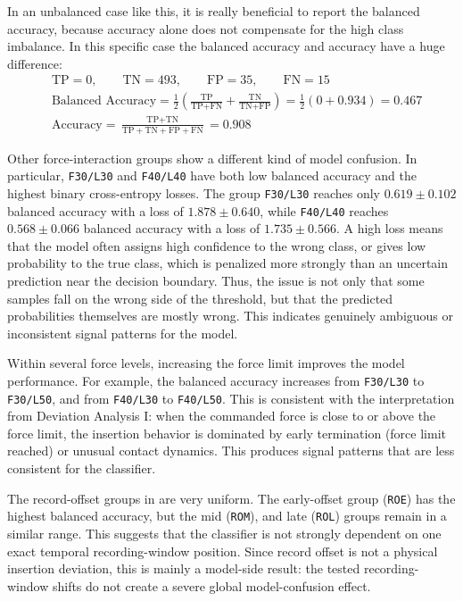 In an unbalanced case like this, it is really beneficial to report the balanced accuracy, because accuracy alone does not compensate for the high class imbalance.
In this specific case the balanced accuracy and accuracy have a huge difference:
\begin{align*}
    &\text{TP} = 0, \qquad \text{TN} = 493, \qquad \text{FP} = 35, \qquad \text{FN} = 15\\
    &\text{Balanced Accuracy} = \frac{1}{2}\left( \frac{\text{TP}}{\text{TP} + \text{FN}} + \frac{\text{TN}}{\text{TN} + \text{FP}} \right)= \frac{1}{2}(0 + 0.934) = 0.467\\
    &\text{Accuracy} = \frac{\text{TP} + \text{TN}}{\text{TP} + \text{TN} + \text{FP} + \text{FN}} = 0.908
    \label{eq:bal_acc_vs_acc}
\end{align*}

Other force-interaction groups show a different kind of model confusion. In particular, \texttt{F30/L30} and \texttt{F40/L40} have both low balanced accuracy and the highest binary cross-entropy losses. The group \texttt{F30/L30} reaches only $0.619 \pm 0.102$ balanced accuracy with a loss of $1.878 \pm 0.640$, while \texttt{F40/L40} reaches $0.568 \pm 0.066$ balanced accuracy with a loss of $1.735 \pm 0.566$. A high loss means that the model often assigns high confidence to the wrong class, or gives low probability to the true class, which is penalized more strongly than an uncertain prediction near the decision boundary. Thus, the issue is not only that some samples fall on the wrong side of the threshold, but that the predicted probabilities themselves are mostly wrong. This indicates genuinely ambiguous or inconsistent signal patterns for the model.

Within several force levels, increasing the force limit improves the model performance. For example, the balanced accuracy increases from \texttt{F30/L30} to \texttt{F30/L50}, and from \texttt{F40/L30} to \texttt{F40/L50}. This is consistent with the interpretation from Deviation Analysis I: when the commanded force is close to or above the force limit, the insertion behavior is dominated by early termination (force limit reached) or unusual contact dynamics. This produces signal patterns that are less consistent for the classifier.

The record-offset groups in  are very uniform. The early-offset group (\texttt{ROE}) has the highest balanced accuracy, but the mid (\texttt{ROM}), and late (\texttt{ROL}) groups remain in a similar range. This suggests that the classifier is not strongly dependent on one exact temporal recording-window position. Since record offset is not a physical insertion deviation, this is mainly a model-side result: the tested recording-window shifts do not create a severe global model-confusion effect.

